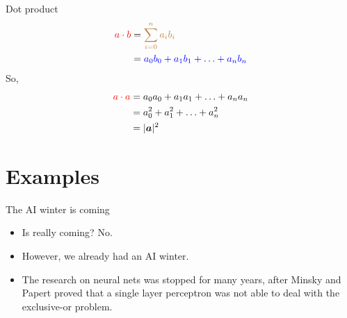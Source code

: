 \documentclass[handout]{beamer}
\begin{document}
\begin{frame}{Dot product}
    \Large
    \begin{align*}
        \textcolor{red}{a \cdot b} &= \textcolor{brown}{\sum_{i=0}^{n} a_i b_i} \\
                                   &= \textcolor{blue}{a_0b_0 + a_1b_1 + \ldots + a_nb_n}
    \end{align*}
    So,
    \begin{align*}
        \textcolor{red}{a \cdot a} &= a_0a_0 + a_1a_1 + \ldots + a_na_n \\
                                   &= a_0^2  + a_1^2  + \ldots + a_n^2 \\
                                   &= |\boldsymbol{a}|^2
    \end{align*}
\end{frame}

\section{Examples}
{
%
\begin{frame}{}
\end{frame}
}

\begin{frame}{The AI winter is coming}
    \begin{itemize}
        \item Is really coming? No.
        \item However, we already had an AI winter.
        \item The research on neural nets was stopped for many years, after
                Minsky and Papert proved that a single layer perceptron was not able to
                deal with the exclusive-or problem.
    \end{itemize}
\end{frame}
\end{document}

